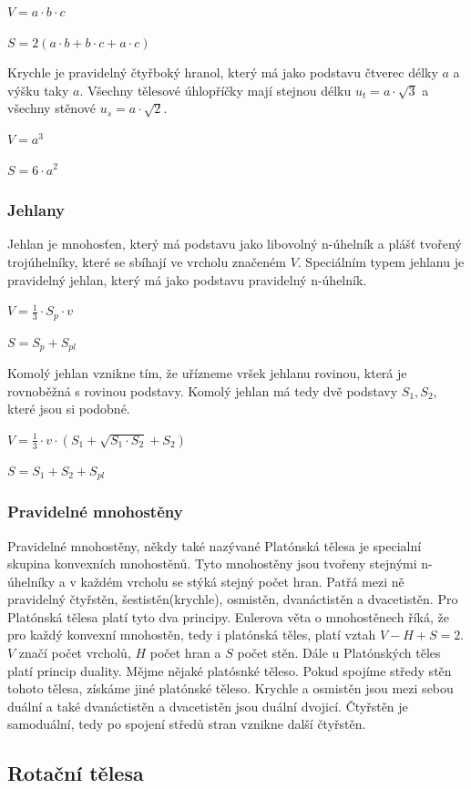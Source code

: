 \documentclass[12pt]{article}
\begin{document}
$V = a \cdot b \cdot c$

$S = 2(a \cdot b + b \cdot c + a \cdot c)$

Krychle je pravidelný čtyřboký hranol, který má jako podstavu čtverec délky $a$ a výšku taky $a$.
Všechny tělesové úhlopříčky mají stejnou délku $u_t = a \cdot \sqrt{3}$ a všechny stěnové $u_s =
a \cdot \sqrt{2}$.

$V = a^3$

$S = 6 \cdot a^2$

\subsubsection*{Jehlany}
Jehlan je mnohosťen, který má podstavu jako libovolný n-úhelník a plášť tvořený trojúhelníky, které
se sbíhají ve vrcholu značeném $V$. Speciálním typem jehlanu je pravidelný jehlan, který má jako
podstavu pravidelný n-úhelník.

$V = \frac{1}{3} \cdot S_p \cdot v$

$S = S_p + S_{pl}$

Komolý jehlan vznikne tím, že uřízneme vršek jehlanu rovinou, která je rovnoběžná s rovinou podstavy.
Komolý jehlan má tedy dvě podstavy $S_1, S_2$, které jsou si podobné.

$V = \frac{1}{3} \cdot v \cdot (S_1 + \sqrt{S_1 \cdot S_2} + S_2)$

$S = S_1 + S_2 + S_{pl}$
\subsubsection*{Pravidelné mnohostěny}
Pravidelné mnohostěny, někdy také nazývané Platónská tělesa je specialní skupina konvexních 
mnohostěnů. Tyto mnohostěny jsou tvořeny stejnými n-úhelníky a v každém vrcholu se stýká stejný
počet hran. Patřá mezi ně pravidelný čtyřstěn, šestistěn(krychle), osmistěn, dvanáctistěn a
dvacetistěn. Pro Platónská tělesa platí tyto dva principy. Eulerova věta o mnohostěnech říká,
že pro každý konvexní mnohostěn, tedy i platónská těles, platí vztah $V - H + S = 2$. $V$ značí
počet vrcholů, $H$ počet hran a $S$ počet stěn. Dále u Platónských těles platí princip duality.
Mějme nějaké platósnké těleso. Pokud spojíme středy stěn tohoto tělesa, získáme jiné platónské
těleso. Krychle a osmistěn jsou mezi sebou duální a také dvanáctistěn a dvacetistěn jsou duální
dvojicí. Čtyřstěn je samoduální, tedy po spojení středů stran vznikne další čtyřstěn.

\subsection*{Rotační tělesa}
\end{document}
